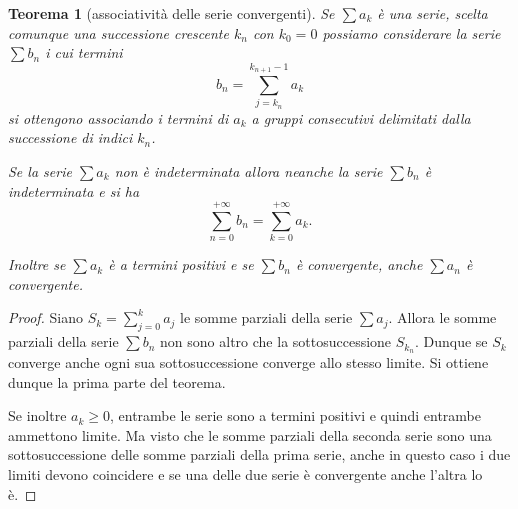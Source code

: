 \documentclass[italian,a4paper,oneside,headinclude]{scrbook}
\newtheorem{theorem}{Teorema}
\begin{document}
\begin{theorem}[associatività delle serie convergenti]
Se $\sum a_k$ è una serie, scelta comunque
una successione crescente $k_n$ con $k_0=0$
possiamo considerare la serie $\sum b_n$
i cui termini
\[
  b_n = \sum_{j=k_n}^{k_{n+1}-1} a_k
\]
si ottengono associando i termini di $a_k$ a gruppi
consecutivi delimitati dalla successione di indici
$k_n$.

Se la serie $\sum a_k$ non è indeterminata
allora neanche la serie $\sum b_n$ è indeterminata e si ha
\[
\sum_{n=0}^{+\infty} b_n
= \sum_{k=0}^{+\infty} a_k.
\]

Inoltre se $\sum a_k$ è a termini positivi e se
$\sum b_n$ è convergente, anche $\sum a_n$ è convergente.
\end{theorem}
%
\begin{proof}
Siano $S_k = \sum_{j=0}^k a_j$ le somme parziali della
serie $\sum a_j$. Allora le somme parziali della serie $\sum b_n$
non sono altro che la sottosuccessione $S_{k_n}$.
Dunque se $S_k$ converge anche ogni sua sottosuccessione
converge allo stesso limite. Si ottiene dunque
la prima parte del teorema.

Se inoltre $a_k \ge 0$, entrambe le serie sono a termini positivi
e quindi entrambe ammettono limite. Ma visto che le somme parziali
della seconda serie sono una sottosuccessione delle somme
parziali della prima serie, anche in questo caso i due limiti
devono coincidere e se una delle due serie è convergente
anche l'altra lo è.
\end{proof}
\end{document}
